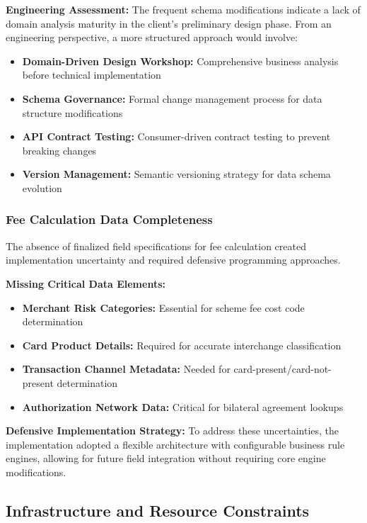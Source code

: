 \textbf{Engineering Assessment:}
The frequent schema modifications indicate a lack of domain analysis maturity in the client's preliminary design phase. From an engineering perspective, a more structured approach would involve:

\begin{itemize}
    \item \textbf{Domain-Driven Design Workshop:} Comprehensive business analysis before technical implementation
    \item \textbf{Schema Governance:} Formal change management process for data structure modifications
    \item \textbf{API Contract Testing:} Consumer-driven contract testing to prevent breaking changes
    \item \textbf{Version Management:} Semantic versioning strategy for data schema evolution
\end{itemize}

\subsubsection{Fee Calculation Data Completeness}

The absence of finalized field specifications for fee calculation created implementation uncertainty and required defensive programming approaches.

\textbf{Missing Critical Data Elements:}
\begin{itemize}
    \item \textbf{Merchant Risk Categories:} Essential for scheme fee cost code determination
    \item \textbf{Card Product Details:} Required for accurate interchange classification
    \item \textbf{Transaction Channel Metadata:} Needed for card-present/card-not-present determination
    \item \textbf{Authorization Network Data:} Critical for bilateral agreement lookups
\end{itemize}

\textbf{Defensive Implementation Strategy:}
To address these uncertainties, the implementation adopted a flexible architecture with configurable business rule engines, allowing for future field integration without requiring core engine modifications.

\subsection{Infrastructure and Resource Constraints}


